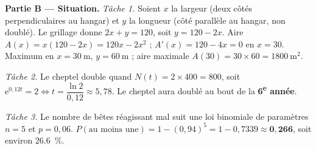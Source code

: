 \smallskip
\noindent\textbf{Partie B — Situation.}
\emph{Tâche 1.} Soient $x$ la largeur (deux côtés perpendiculaires au hangar) et $y$ la
longueur (côté parallèle au hangar, non doublé). Le grillage donne $2x+y=120$, soit
$y=120-2x$. Aire $A(x)=x(120-2x)=120x-2x^2$ ; $A'(x)=120-4x=0$ en $x=30$. Maximum en
$x=\SI{30}{\metre}$, $y=\SI{60}{\metre}$ ; aire maximale $A(30)=30\times60=\SI{1800}{\metre\squared}$.

\emph{Tâche 2.} Le cheptel double quand $N(t)=2\times400=800$, soit
$\mathrm{e}^{0{,}12t}=2 \iff t=\dfrac{\ln 2}{0{,}12}\approx5{,}78$. Le cheptel aura doublé
au bout de la \textbf{6\textsuperscript{e} année}.

\emph{Tâche 3.} Le nombre de bêtes réagissant mal suit une loi binomiale de paramètres
$n=5$ et $p=0{,}06$. $P(\text{au moins une})=1-(0{,}94)^5=1-0{,}7339\approx\mathbf{0{,}266}$,
soit environ \SI{26,6}{\percent}.
